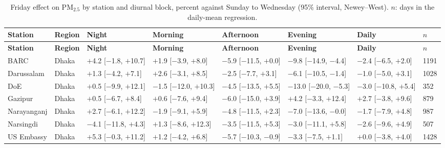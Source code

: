 \begingroup\footnotesize
\begin{longtable}{L{2.8cm} L{1.4cm} C{2.0cm} C{2.0cm} C{2.0cm} C{2.0cm} C{2.0cm} C{0.9cm}}
\caption{Friday effect on PM$_{2.5}$ by station and diurnal block, percent against Sunday to Wednesday (95\% interval, Newey--West). $n$: days in the daily-mean regression.}\label{tab:s-station}\\
\toprule
\textbf{Station} & \textbf{Region} & \textbf{Night} & \textbf{Morning} & \textbf{Afternoon} & \textbf{Evening} & \textbf{Daily} & \textbf{$n$} \\
\midrule\endfirsthead
\toprule
\textbf{Station} & \textbf{Region} & \textbf{Night} & \textbf{Morning} & \textbf{Afternoon} & \textbf{Evening} & \textbf{Daily} & \textbf{$n$} \\
\midrule\endhead
\bottomrule\endfoot
BARC & Dhaka & $+$4.2 {\scriptsize[$-$1.8, $+$10.7]} & $+$1.9 {\scriptsize[$-$3.9, $+$8.0]} & $-$5.9 {\scriptsize[$-$11.5, $+$0.0]} & $-$9.8 {\scriptsize[$-$14.9, $-$4.4]} & $-$2.4 {\scriptsize[$-$6.5, $+$2.0]} & 1191 \\
Darussalam & Dhaka & $+$1.3 {\scriptsize[$-$4.2, $+$7.1]} & $+$2.6 {\scriptsize[$-$3.1, $+$8.5]} & $-$2.5 {\scriptsize[$-$7.7, $+$3.1]} & $-$6.1 {\scriptsize[$-$10.5, $-$1.4]} & $-$1.0 {\scriptsize[$-$5.0, $+$3.1]} & 1028 \\
DoE & Dhaka & $+$0.5 {\scriptsize[$-$9.9, $+$12.1]} & $-$1.5 {\scriptsize[$-$12.0, $+$10.3]} & $-$4.5 {\scriptsize[$-$13.5, $+$5.5]} & $-$13.0 {\scriptsize[$-$20.0, $-$5.3]} & $-$3.0 {\scriptsize[$-$10.8, $+$5.4]} & 352 \\
Gazipur & Dhaka & $+$0.5 {\scriptsize[$-$6.7, $+$8.4]} & $+$0.6 {\scriptsize[$-$7.6, $+$9.4]} & $-$6.0 {\scriptsize[$-$15.0, $+$3.9]} & $+$4.2 {\scriptsize[$-$3.3, $+$12.4]} & $+$2.7 {\scriptsize[$-$3.8, $+$9.6]} & 879 \\
Narayanganj & Dhaka & $+$2.7 {\scriptsize[$-$6.1, $+$12.2]} & $-$1.9 {\scriptsize[$-$9.1, $+$5.9]} & $-$4.8 {\scriptsize[$-$11.5, $+$2.3]} & $-$7.0 {\scriptsize[$-$13.6, $-$0.0]} & $-$1.7 {\scriptsize[$-$7.9, $+$4.8]} & 987 \\
Narsingdi & Dhaka & $-$4.1 {\scriptsize[$-$11.8, $+$4.3]} & $+$1.3 {\scriptsize[$-$8.6, $+$12.3]} & $-$3.5 {\scriptsize[$-$11.5, $+$5.3]} & $-$3.0 {\scriptsize[$-$11.1, $+$5.8]} & $-$2.6 {\scriptsize[$-$9.6, $+$4.9]} & 507 \\
US Embassy & Dhaka & $+$5.3 {\scriptsize[$-$0.3, $+$11.2]} & $+$1.2 {\scriptsize[$-$4.2, $+$6.8]} & $-$5.7 {\scriptsize[$-$10.3, $-$0.9]} & $-$3.3 {\scriptsize[$-$7.5, $+$1.1]} & $+$0.0 {\scriptsize[$-$3.8, $+$4.0]} & 1428 \\

\end{longtable}
